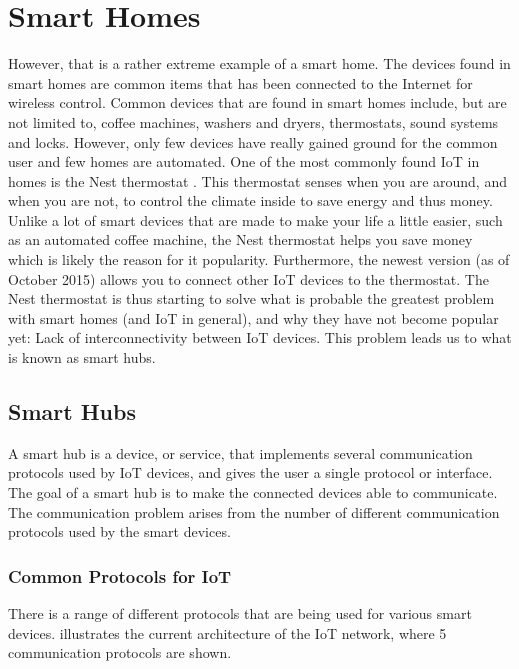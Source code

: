 \section{Smart Homes}\label{sec:smarthomes}
However, that is a rather extreme example of a smart home. 
The devices found in smart homes are common items that has been connected to the Internet for wireless control.
Common devices that are found in smart homes include, but are not limited to, 
coffee machines, washers and dryers, thermostats, sound systems and locks. 
However, only few devices have really gained ground for the common user and few homes are automated.
One of the most commonly found IoT in homes is the Nest thermostat \cite{NEST}. 
This thermostat senses when you are around, and when you are not, 
to control the climate inside to save energy and thus money.
Unlike a lot of smart devices that are made to make your life a little easier, such as an automated coffee machine, 
the Nest thermostat helps you save money which is likely the reason for it popularity. 
Furthermore, the newest version (as of October 2015) allows you to connect other IoT devices to the thermostat. 
The Nest thermostat is thus starting to solve what is probable the greatest problem with smart homes (and IoT in general), 
and why they have not become popular yet: Lack of interconnectivity between IoT devices. 
This problem leads us to what is known as smart hubs. 

\subsection{Smart Hubs}
A smart hub is a device, or service, that implements several communication protocols used by IoT devices, 
and gives the user a single protocol or interface. 
The goal of a smart hub is to make the connected devices able to communicate.
The communication problem arises from the number of different communication protocols used by the smart devices. 


\subsubsection{Common Protocols for IoT}
There is a range of different protocols that are being used for various smart devices. 
 illustrates the current architecture of the IoT network,
where \num{5} communication protocols are shown. 

%    

